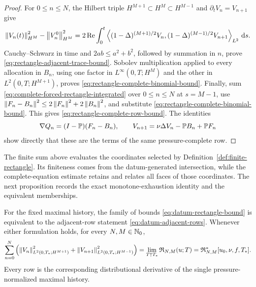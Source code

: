 \begin{proof}
For \(0\le n\le N\), the Hilbert triple
\(H^{M+1}\subset H^M\subset H^{M-1}\) and
\(\partial_tV_n=V_{n+1}\) give
\[
 \left\lVert V_n(t)\right\rVert_{H^M}^2-\left\lVert V_n^0\right\rVert_{H^M}^2
 =2\operatorname{Re}\int_0^t
 \left\langle (1-\Delta)^{(M+1)/2}V_n,(1-\Delta)^{(M-1)/2}V_{n+1}\right\rangle_{L^2}\,\mathrm d s.
\]
Cauchy--Schwarz in time and \(2ab\le a^2+b^2\), followed by summation in
\(n\), prove \eqref{eq:rectangle-adjacent-trace-bound}.  Sobolev
multiplication applied to every allocation in \(B_n\), using one factor in
\(L^\infty(0,T;H^M)\) and the other in
\(L^2(0,T;H^{M+1})\), proves
\eqref{eq:rectangle-complete-binomial-bound}.  Finally, sum
\eqref{eq:complete-forced-rectangle-integrated} over \(0\le n\le N\) at
\(s=M-1\), use
\(\left\lVert F_n-B_n\right\rVert^2\le2\left\lVert F_n\right\rVert^2+2\left\lVert B_n\right\rVert^2\), and substitute
\eqref{eq:rectangle-complete-binomial-bound}.  This gives
\eqref{eq:rectangle-complete-row-bound}.  The identities
\[
 \nabla Q_n=(I-\mathbb P)(F_n-B_n),
 \qquad
 V_{n+1}=\nu\Delta V_n-\mathbb P B_n+\mathbb P F_n
\]
show directly that these are the terms of the same pressure-complete row.
\end{proof}

The finite sum above evaluates the coordinates selected by
Definition~\ref{def:finite-rectangle}.  Its finiteness comes from the
datum-generated intersection, while the complete-equation estimate retains
and relates all faces of those coordinates.  The next proposition records the
exact monotone-exhaustion identity and the equivalent memberships.

\begin{proposition}
\label{prop:datum-terminal-realization}

For the fixed maximal history, the family of bounds
\eqref{eq:datum-rectangle-bound} is equivalent to the adjacent-row statement
\eqref{eq:datum-adjacent-rows}.  Whenever either formulation holds, for every
\(N,M\in\mathbb N_0\),
\begin{equation}
 \sum_{n=0}^{N}\left(
 \left\lVert V_n\right\rVert_{L^2(0,T_*;H^{M+1})}^2
 +\left\lVert V_{n+1}\right\rVert_{L^2(0,T_*;H^{M-1})}^2
 \right)
 =\lim_{T\uparrow T_*}\mathfrak R_{N,M}(u;T)
 =\mathfrak R_{N,M}^*[u_0,\nu,f,T_*].
 \label{eq:datum-terminal-monotone-realization}
\end{equation}
Every row is the corresponding distributional derivative of the single
pressure-normalized maximal history.
\end{proposition}

